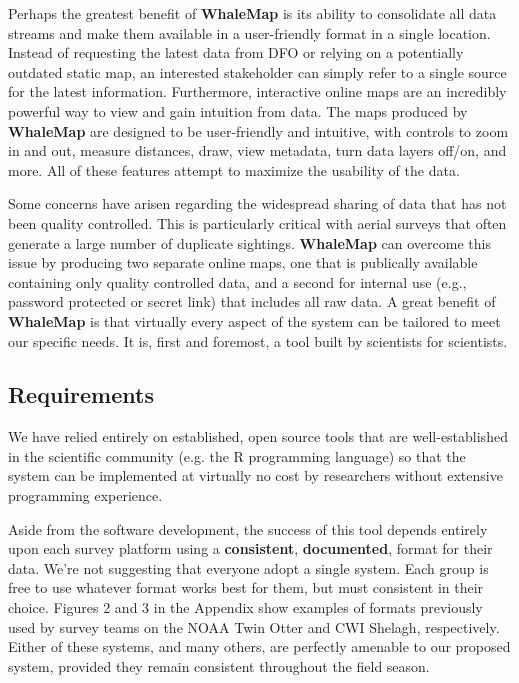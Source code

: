 \documentclass[11pt, letterpaper]{article}
\begin{document}
Perhaps the greatest benefit of \textbf{WhaleMap} is its ability to consolidate all data streams and make them available in a user-friendly format in a single location. Instead of requesting the latest data from DFO or relying on a potentially outdated static map, an interested stakeholder can simply refer to a single source for the latest information. Furthermore, interactive online maps are an incredibly powerful way to view and gain intuition from data. The maps produced by \textbf{WhaleMap} are designed to be user-friendly and intuitive, with controls to zoom in and out, measure distances, draw, view metadata, turn data layers off/on, and more. All of these features attempt to maximize the usability of the data. 

Some concerns have arisen regarding the widespread sharing of data that has not been quality controlled. This is particularly critical with aerial surveys that often generate a large number of duplicate sightings. \textbf{WhaleMap} can overcome this issue by producing two separate online maps, one that is publically available containing only quality controlled data, and a second for internal use (e.g., password protected or secret link) that includes all raw data. A great benefit of \textbf{WhaleMap} is that virtually every aspect of the system can be tailored to meet our specific needs. It is, first and foremost, a tool built by scientists for scientists. 

\subsection{Requirements}

We have relied entirely on established, open source tools that are well-established in the scientific community (e.g. the R programming language) so that the system can be implemented at virtually no cost by researchers without extensive programming experience.

Aside from the software development, the success of this tool depends entirely upon each survey platform using a \textbf{consistent}, \textbf{documented}, format for their data. We're not suggesting that everyone adopt a single system. Each group is free to use whatever format works best for them, but must consistent in their choice. Figures 2 and 3 in the Appendix show examples of formats previously used by survey teams on the NOAA Twin Otter and CWI Shelagh, respectively. Either of these systems, and many others, are perfectly amenable to our proposed system, provided they remain consistent throughout the field season.
\end{document}
